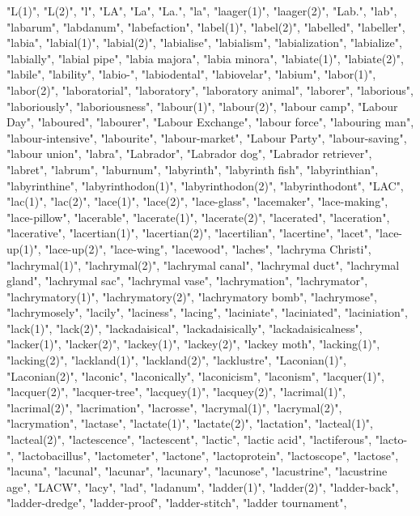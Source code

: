 "L(1)",
"L(2)",
"l",
"LA",
"La",
"La.",
"la",
"laager(1)",
"laager(2)",
"Lab.",
"lab",
"labarum",
"labdanum",
"labefaction",
"label(1)",
"label(2)",
"labelled",
"labeller",
"labia",
"labial(1)",
"labial(2)",
"labialise",
"labialism",
"labialization",
"labialize",
"labially",
"labial pipe",
"labia majora",
"labia minora",
"labiate(1)",
"labiate(2)",
"labile",
"lability",
"labio-",
"labiodental",
"labiovelar",
"labium",
"labor(1)",
"labor(2)",
"laboratorial",
"laboratory",
"laboratory animal",
"laborer",
"laborious",
"laboriously",
"laboriousness",
"labour(1)",
"labour(2)",
"labour camp",
"Labour Day",
"laboured",
"labourer",
"Labour Exchange",
"labour force",
"labouring man",
"labour-intensive",
"labourite",
"labour-market",
"Labour Party",
"labour-saving",
"labour union",
"labra",
"Labrador",
"Labrador dog",
"Labrador retriever",
"labret",
"labrum",
"laburnum",
"labyrinth",
"labyrinth fish",
"labyrinthian",
"labyrinthine",
"labyrinthodon(1)",
"labyrinthodon(2)",
"labyrinthodont",
"LAC",
"lac(1)",
"lac(2)",
"lace(1)",
"lace(2)",
"lace-glass",
"lacemaker",
"lace-making",
"lace-pillow",
"lacerable",
"lacerate(1)",
"lacerate(2)",
"lacerated",
"laceration",
"lacerative",
"lacertian(1)",
"lacertian(2)",
"lacertilian",
"lacertine",
"lacet",
"lace-up(1)",
"lace-up(2)",
"lace-wing",
"lacewood",
"laches",
"lachryma Christi",
"lachrymal(1)",
"lachrymal(2)",
"lachrymal canal",
"lachrymal duct",
"lachrymal gland",
"lachrymal sac",
"lachrymal vase",
"lachrymation",
"lachrymator",
"lachrymatory(1)",
"lachrymatory(2)",
"lachrymatory bomb",
"lachrymose",
"lachrymosely",
"lacily",
"laciness",
"lacing",
"laciniate",
"laciniated",
"laciniation",
"lack(1)",
"lack(2)",
"lackadaisical",
"lackadaisically",
"lackadaisicalness",
"lacker(1)",
"lacker(2)",
"lackey(1)",
"lackey(2)",
"lackey moth",
"lacking(1)",
"lacking(2)",
"lackland(1)",
"lackland(2)",
"lacklustre",
"Laconian(1)",
"Laconian(2)",
"laconic",
"laconically",
"laconicism",
"laconism",
"lacquer(1)",
"lacquer(2)",
"lacquer-tree",
"lacquey(1)",
"lacquey(2)",
"lacrimal(1)",
"lacrimal(2)",
"lacrimation",
"lacrosse",
"lacrymal(1)",
"lacrymal(2)",
"lacrymation",
"lactase",
"lactate(1)",
"lactate(2)",
"lactation",
"lacteal(1)",
"lacteal(2)",
"lactescence",
"lactescent",
"lactic",
"lactic acid",
"lactiferous",
"lacto-",
"lactobacillus",
"lactometer",
"lactone",
"lactoprotein",
"lactoscope",
"lactose",
"lacuna",
"lacunal",
"lacunar",
"lacunary",
"lacunose",
"lacustrine",
"lacustrine age",
"LACW",
"lacy",
"lad",
"ladanum",
"ladder(1)",
"ladder(2)",
"ladder-back",
"ladder-dredge",
"ladder-proof",
"ladder-stitch",
"ladder tournament",
